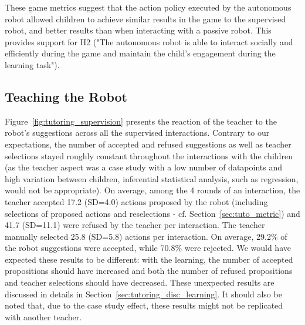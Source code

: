These game metrics suggest that the action policy executed by the autonomous robot allowed children to achieve similar results in the game to the supervised robot, and better results than when interacting with a passive robot. This provides support for H2 ("The autonomous robot is able to interact socially and efficiently during the game and maintain the child's engagement during the learning task"). 

\subsection{Teaching the Robot}

Figure~\ref{fig:tutoring_supervision} presents the reaction of the teacher to the robot's suggestions across all the supervised interactions. Contrary to our expectations, the number of accepted and refused suggestions as well as teacher selections stayed roughly constant throughout the interactions with the children (as the teacher aspect was a case study with a low number of datapoints and high variation between children, inferential statistical analysis, such as regression, would not be appropriate). On average, among the 4 rounds of an interaction, the teacher accepted 17.2 (SD=4.0) actions proposed by the robot (including selections of proposed actions and reselections - cf. Section~\ref{sec:tuto_metric}) and 41.7 (SD=11.1) were refused by the teacher per interaction. The teacher manually selected 25.8 (SD=5.8) actions per interaction. On average, 29.2\% of the robot suggestions were accepted, while 70.8\% were rejected. We would have expected these results to be different: with the learning, the number of accepted propositions should have increased and both the number of refused propositions and teacher selections should have decreased. These unexpected results are discussed in details in Section~\ref{sec:tutoring_disc_learning}. It should also be noted that, due to the case study effect, these results might not be replicated with another teacher.

